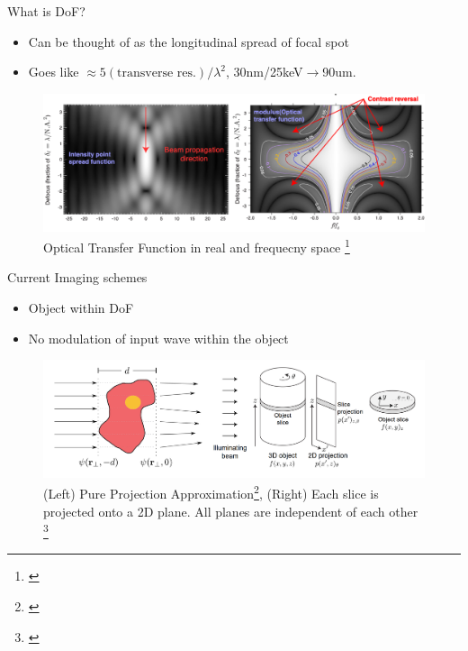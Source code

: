 \documentclass{beamer}
\begin{document}
\begin{frame}{What is DoF?}
\begin{itemize}
	\item Can be thought of as the longitudinal spread of focal spot
	\item Goes like $\approx5(\mbox{transverse res.})/\lambda^{2}$, 30nm/25keV$\rightarrow$90um.
\end{itemize}
	\begin{center}
		\begin{figure}
		\includegraphics[scale=0.3]{dof}
		\caption{Optical Transfer Function in real and frequecny space \footnote{\cite{jacobsen_2019}}}	
		\end{figure}
	\end{center}
\end{frame}

\begin{frame}{Current Imaging schemes}
	\begin{itemize}
		\item Object within DoF
		\item No modulation of input wave within the object
	\end{itemize}
	\begin{center}
	\begin{figure}
		\includegraphics[scale=0.4]{ppa4}
			\caption{(Left) Pure Projection Approximation\footnote{\cite{Krenkel}}, (Right) Each slice is projected onto a 2D plane. All planes are independent of each other	\footnote{\cite{jacobsen_2019}}}
	\end{figure}
\end{center}


\end{frame}
\end{document}
